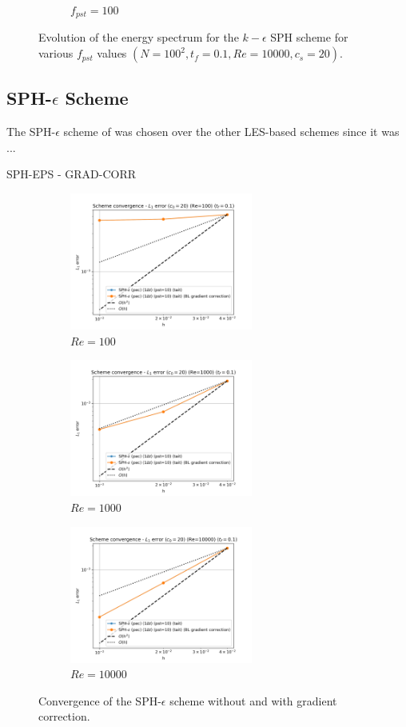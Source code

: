 \begin{figure}[H]
\begin{subfigure}{7cm}
    \caption{$f_{pst} = 100$}
  \end{subfigure}
  \caption{Evolution of the energy spectrum for the $k-\epsilon$ SPH scheme for various $f_{pst}$ values $(N=100^2, t_f=0.1, Re=10000, c_s=20)$.}
  \label{fig:keps-pst-espec}
\end{figure}



\subsection[SPH-epsilon Scheme]{SPH-$\epsilon$ Scheme}
The SPH-$\epsilon$ scheme of \cite{Monaghan2017} was chosen over the other LES-based schemes since it was ...


SPH-EPS - GRAD-CORR   
\begin{figure}[H]
  \begin{subfigure}{7cm}
    \centering\includegraphics[width=6cm]{Code-Figures/mon2017/grad_corr/dt_pois_conv_c0_20_re_100.png}
    \caption{$Re = 100$}
  \end{subfigure}
  \begin{subfigure}{7cm}
    \centering\includegraphics[width=6cm]{Code-Figures/mon2017/grad_corr/dt_pois_conv_c0_20_re_1000.png}
    \caption{$Re = 1000$}
  \end{subfigure}
  \begin{subfigure}{7cm}
    \centering\includegraphics[width=6cm]{Code-Figures/mon2017/grad_corr/dt_pois_conv_c0_20_re_10000.png}
    \caption{$Re = 10000$}
  \end{subfigure}
  \caption{Convergence of the SPH-$\epsilon$ scheme without and with gradient correction.}
  \label{fig:sph-eps-grad-corr}
\end{figure}


